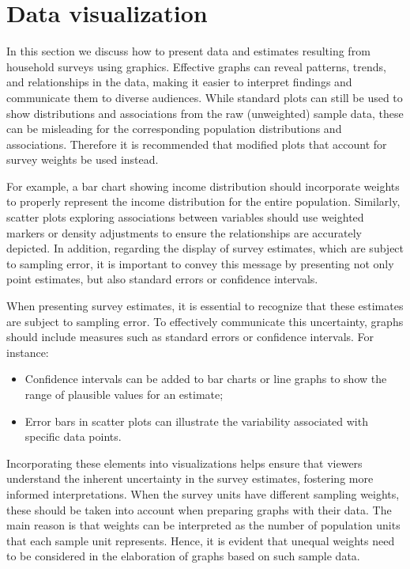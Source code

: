 \documentclass[
  12pt,
]{book}
\begin{document}
\hypertarget{data-visualization}{%
\chapter{Data visualization}\label{data-visualization}}

In this section we discuss how to present data and estimates resulting from household surveys using graphics. Effective graphs can reveal patterns, trends, and relationships in the data, making it easier to interpret findings and communicate them to diverse audiences. While standard plots can still be used to show distributions and associations from the raw (unweighted) sample data, these can be misleading for the corresponding population distributions and associations. Therefore it is recommended that modified plots that account for survey weights be used instead.

For example, a bar chart showing income distribution should incorporate weights to properly represent the income distribution for the entire population. Similarly, scatter plots exploring associations between variables should use weighted markers or density adjustments to ensure the relationships are accurately depicted. In addition, regarding the display of survey estimates, which are subject to sampling error, it is important to convey this message by presenting not only point estimates, but also standard errors or confidence intervals.

When presenting survey estimates, it is essential to recognize that these estimates are subject to sampling error. To effectively communicate this uncertainty, graphs should include measures such as standard errors or confidence intervals. For instance:

\begin{itemize}
\item
  Confidence intervals can be added to bar charts or line graphs to show the range of plausible values for an estimate;
\item
  Error bars in scatter plots can illustrate the variability associated with specific data points.
\end{itemize}

Incorporating these elements into visualizations helps ensure that viewers understand the inherent uncertainty in the survey estimates, fostering more informed interpretations. When the survey units have different sampling weights, these should be taken into account when preparing graphs with their data. The main reason is that weights can be interpreted as the number of population units that each sample unit represents. Hence, it is evident that unequal weights need to be considered in the elaboration of graphs based on such sample data.
\end{document}

